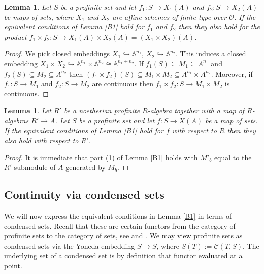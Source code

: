 \documentclass{amsart}
\newtheorem{lem}[prop]{Lemma}
\theoremstyle{definition}
\theoremstyle{remark}
\newcommand{\OO}{\mathcal O}
\newcommand{\Cont}{\mathcal{C}}
\begin{document}
\begin{lem}\label{B3} Let $S$ be a profinite set and let $f_1: S\rightarrow X_1(A)$ and 
$f_2: S\rightarrow X_2(A)$ be maps of sets, where $X_1$ and $X_2$ are affine schemes
of finite type over $\OO$. If the equivalent conditions of Lemma \ref{B1} hold for $f_1$ and $f_2$ then they 
also hold for the product $f_1\times f_2: S\rightarrow X_1(A)\times X_2(A)=(X_1\times X_2)(A)$. 
\end{lem} 
\begin{proof} We pick closed embeddings $X_1\hookrightarrow \mathbb A^{n_1}$, 
$X_2\hookrightarrow \mathbb A^{n_2}$. This induces a closed embedding 
$X_1\times X_2\hookrightarrow \mathbb A^{n_1}\times \mathbb A^{n_2} \cong 
\mathbb A^{n_1+n_2}$. If $f_1(S)\subseteq M_1\subseteq A^{n_1}$ and $f_2(S)\subseteq M_2 \subseteq A^{n_2}$ then 
$(f_1\times f_2)(S)\subseteq M_1\times M_2\subseteq A^{n_1}\times A^{n_2}$. Moreover, if 
$f_1: S\rightarrow M_1$ and $f_2: S\rightarrow M_2$ are continuous then $f_1\times f_2: S\rightarrow M_1\times M_2$ 
is continuous. 
\end{proof} 

\begin{lem}\label{B4} Let $R'$ be a noetherian profinite $R$-algebra together with a map of $R$-algebras $R'\rightarrow A$.
Let $S$ be a profinite set and let $f: S\rightarrow X(A)$ be a map of sets. If the equivalent 
conditions of Lemma \ref{B1} hold for $f$ with respect to $R$ then they also hold with respect to $R'$.
\end{lem}
\begin{proof} It is immediate that part (1) of Lemma \ref{B1} holds with $M'_b$ equal to the $R'$-submodule  of $A$ generated by $M_b$. 
\end{proof}


\subsection{Continuity via condensed sets}\label{sec_cond} We will now express the equivalent conditions
in Lemma \ref{B1} in terms of condensed sets. Recall that these are certain functors
from the category of profinite sets to the category of sets, see \cite{ScholzeCond} and .
We may view profinite 
sets as condensed sets via the Yoneda embedding $S\mapsto \underline{S}$, where $\underline S (T) := \Cont(T,S)$. The underlying set of a 
condensed set is by definition that functor evaluated at a point.
\end{document}
